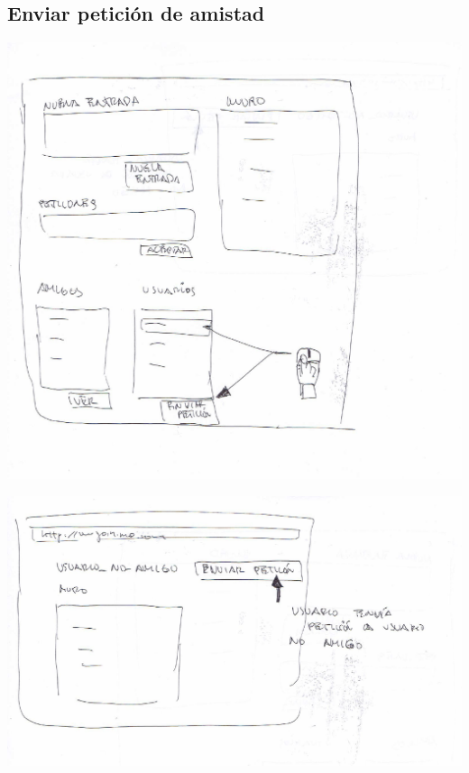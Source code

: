 \documentclass[12pt, a4paper, titlepage]{article}
\begin{document}
\clearpage

\subsection{Enviar petición de amistad}


	\begin{center}
		\includegraphics[scale=0.6]{Imagenes/enviar_peticion_no_amigo}
	\end{center}



	\begin{center}
		\includegraphics[scale=0.6]{Imagenes/enviar_peticion_no_amigo_2}
	\end{center}
\end{document}
